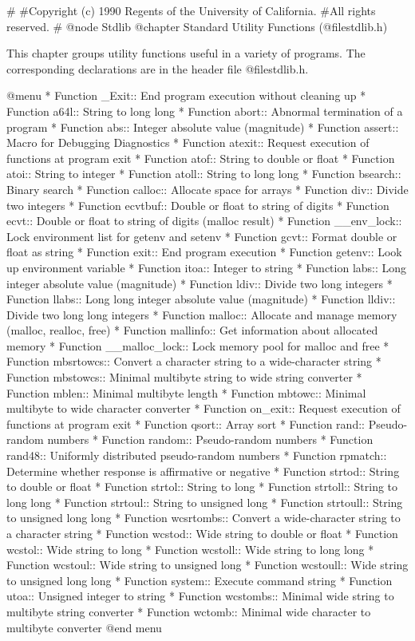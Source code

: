 #
#Copyright (c) 1990 Regents of the University of California.
#All rights reserved.
#
@node Stdlib
@chapter Standard Utility Functions (@file{stdlib.h})

This chapter groups utility functions useful in a variety of programs.
The corresponding declarations are in the header file @file{stdlib.h}.

@menu
* Function _Exit::       End program execution without cleaning up
* Function a64l::        String to long long
* Function abort::       Abnormal termination of a program
* Function abs::         Integer absolute value (magnitude)
* Function assert::      Macro for Debugging Diagnostics
* Function atexit::      Request execution of functions at program exit
* Function atof::        String to double or float
* Function atoi::        String to integer
* Function atoll::       String to long long
* Function bsearch::     Binary search
* Function calloc::      Allocate space for arrays
* Function div::         Divide two integers
* Function ecvtbuf::     Double or float to string of digits
* Function ecvt::        Double or float to string of digits (malloc result)
* Function __env_lock::  Lock environment list for getenv and setenv
* Function gcvt::        Format double or float as string
* Function exit::        End program execution
* Function getenv::      Look up environment variable
* Function itoa::        Integer to string
* Function labs::        Long integer absolute value (magnitude)
* Function ldiv::        Divide two long integers
* Function llabs::       Long long integer absolute value (magnitude)
* Function lldiv::       Divide two long long integers
* Function malloc::      Allocate and manage memory (malloc, realloc, free)
* Function mallinfo::    Get information about allocated memory
* Function __malloc_lock::	Lock memory pool for malloc and free
* Function mbsrtowcs::   Convert a character string to a wide-character string
* Function mbstowcs::    Minimal multibyte string to wide string converter
* Function mblen::       Minimal multibyte length
* Function mbtowc::      Minimal multibyte to wide character converter
* Function on_exit::     Request execution of functions at program exit
* Function qsort::       Array sort
* Function rand::        Pseudo-random numbers
* Function random::      Pseudo-random numbers
* Function rand48::      Uniformly distributed pseudo-random numbers
* Function rpmatch::     Determine whether response is affirmative or negative
* Function strtod::      String to double or float
* Function strtol::      String to long
* Function strtoll::     String to long long
* Function strtoul::     String to unsigned long
* Function strtoull::    String to unsigned long long
* Function wcsrtombs::   Convert a wide-character string to a character string
* Function wcstod::      Wide string to double or float
* Function wcstol::      Wide string to long
* Function wcstoll::     Wide string to long long
* Function wcstoul::     Wide string to unsigned long
* Function wcstoull::    Wide string to unsigned long long
* Function system::      Execute command string
* Function utoa::        Unsigned integer to string
* Function wcstombs::    Minimal wide string to multibyte string converter
* Function wctomb::      Minimal wide character to multibyte converter
@end menu

